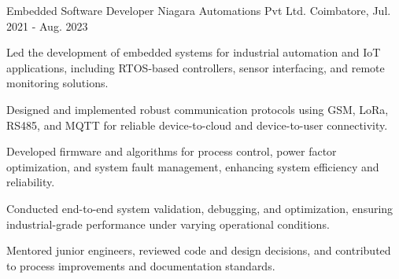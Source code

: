 \begin{cventries}
  \cventry
    {Embedded Software Developer} %
    {Niagara Automations Pvt Ltd.} %
    {Coimbatore,} %
    {Jul. 2021 - Aug. 2023} %
    {
      \begin{cvitems} %
        \item {Led the development of embedded systems for industrial automation and IoT applications, including RTOS-based controllers, sensor interfacing, and remote monitoring solutions.}
        \item {Designed and implemented robust communication protocols using GSM, LoRa, RS485, and MQTT for reliable device-to-cloud and device-to-user connectivity.}
        \item {Developed firmware and algorithms for process control, power factor optimization, and system fault management, enhancing system efficiency and reliability.}
        \item {Conducted end-to-end system validation, debugging, and optimization, ensuring industrial-grade performance under varying operational conditions.}
        \item {Mentored junior engineers, reviewed code and design decisions, and contributed to process improvements and documentation standards.}
      \end{cvitems}
    }

\end{cventries}
